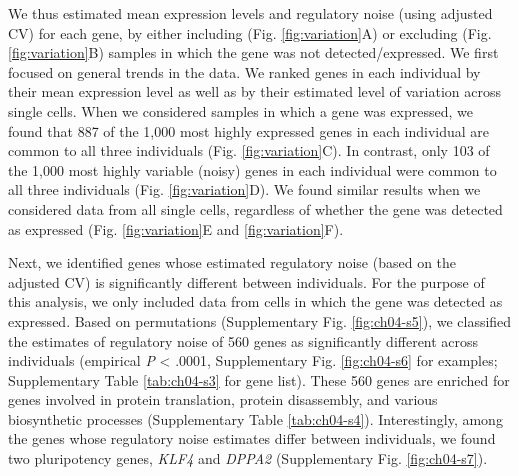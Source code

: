 We thus estimated mean expression levels and regulatory noise (using
adjusted CV) for each gene, by either including (Fig. \ref{fig:variation}A) or excluding
(Fig. \ref{fig:variation}B) samples in which the gene was not detected/expressed. We first
focused on general trends in the data. We ranked genes in each
individual by their mean expression level as well as by their estimated
level of variation across single cells. When we considered samples in
which a gene was expressed, we found that 887 of the 1,000 most highly
expressed genes in each individual are common to all three individuals
(Fig. \ref{fig:variation}C). In contrast, only 103 of the 1,000 most highly variable
(noisy) genes in each individual were common to all three individuals
(Fig. \ref{fig:variation}D). We found similar results when we considered data from all
single cells, regardless of whether the gene was detected as expressed
(Fig. \ref{fig:variation}E and \ref{fig:variation}F).

Next, we identified genes whose estimated regulatory noise (based on the
adjusted CV) is significantly different between individuals. For the
purpose of this analysis, we only included data from cells in which the
gene was detected as expressed. Based on permutations (Supplementary
Fig. \ref{fig:ch04-s5}), we classified the estimates of regulatory noise of 560 genes
as significantly different across individuals (empirical \emph{P}
\textless{} .0001, Supplementary Fig. \ref{fig:ch04-s6} for examples; Supplementary
Table \ref{tab:ch04-s3} for gene list). These 560 genes are enriched for genes involved
in protein translation, protein disassembly, and various biosynthetic
processes (Supplementary Table \ref{tab:ch04-s4}). Interestingly, among the genes whose
regulatory noise estimates differ between individuals, we found two
pluripotency genes, \emph{KLF4} and \emph{DPPA2} (Supplementary Fig.
\ref{fig:ch04-s7}).

